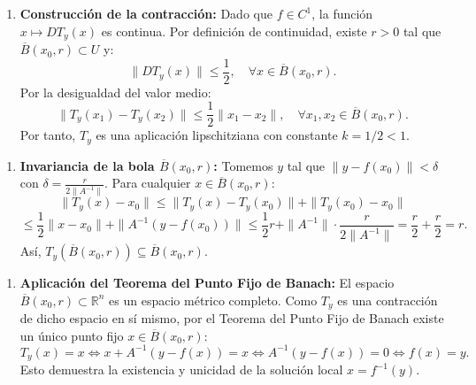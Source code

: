 \documentclass[11pt,a4paper]{article}
\begin{document}
\begin{enumerate}[label=\textbf{\arabic*.}]
\item \textbf{Construcción de la contracción:}
Dado que $f \in C^1$, la función $x \mapsto DT_y(x)$ es continua.
Por definición de continuidad, existe $r > 0$ tal que $\overline{B}(x_0, r) \subset U$ y:
\begin{equation*}
\|DT_y(x)\| \le \frac{1}{2}, \quad \forall x \in \overline{B}(x_0, r).
\end{equation*}
Por la desigualdad del valor medio:
\begin{equation*}
\|T_y(x_1) - T_y(x_2)\| \le \frac{1}{2} \|x_1 - x_2\|, \quad \forall x_1, x_2 \in \overline{B}(x_0, r).
\end{equation*}
Por tanto, $T_y$ es una aplicación lipschitziana con constante $k = 1/2 < 1$.
\end{enumerate}

\begin{enumerate}[label=\textbf{\arabic*.}]
\item \textbf{Invariancia de la bola $\overline{B}(x_0, r)$:}
Tomemos $y$ tal que $\|y - f(x_0)\| < \delta$ con $\delta = \frac{r}{2 \|A^{-1}\|}$.
Para cualquier $x \in \overline{B}(x_0, r)$:
\begin{equation*}
\|T_y(x) - x_0\| \le \|T_y(x) - T_y(x_0)\| + \|T_y(x_0) - x_0\|
\end{equation*}
\begin{equation*}
\le \frac{1}{2}\|x - x_0\| + \|A^{-1}(y - f(x_0))\| \le \frac{1}{2}r + \|A^{-1}\| \cdot \frac{r}{2\|A^{-1}\|} = \frac{r}{2} + \frac{r}{2} = r.
\end{equation*}
Así, $T_y(\overline{B}(x_0, r)) \subseteq \overline{B}(x_0, r)$.
\end{enumerate}

\begin{enumerate}[label=\textbf{\arabic*.}]
\item \textbf{Aplicación del Teorema del Punto Fijo de Banach:}
El espacio $\overline{B}(x_0, r) \subset \mathbb{R}^n$ es un espacio métrico completo. Como $T_y$ es una contracción de dicho espacio en sí mismo, por el Teorema del Punto Fijo de Banach existe un único punto fijo $x \in \overline{B}(x_0, r)$:
\begin{equation*}
T_y(x) = x \iff x + A^{-1}(y - f(x)) = x \iff A^{-1}(y - f(x)) = 0 \iff f(x) = y.
\end{equation*}
Esto demuestra la existencia y unicidad de la solución local $x = f^{-1}(y)$.
\end{enumerate}
\end{document}
